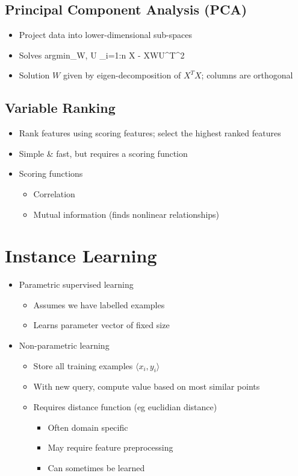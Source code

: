 \documentclass[12pt]{article}
\newcommand{\norm}[1]{\left\lVert#1\right\rVert}
\newenvironment{eqn}{\equation\alignedat{3}}{\endalignedat\endequation}
\begin{document}
\subsection{Principal Component Analysis (PCA)}

\begin{itemize}
	\item Project data into lower-dimensional sub-spaces
	\item Solves
	\begin{eqn}
		argmin_{W, U} \Sigma_{i=1:n} \norm{X - XWU^T}^2
	\end{eqn}
	\item Solution $W$ given by eigen-decomposition of $X^T X$; columns are orthogonal
\end{itemize}

\subsection{Variable Ranking}

\begin{itemize}
	\item Rank features using scoring features; select the highest ranked features
	\item Simple \& fast, but requires a scoring function
	\item Scoring functions 
	\begin{itemize}
		\item Correlation
		\item Mutual information (finds  nonlinear relationships)
	\end{itemize}
\end{itemize}

\section{Instance Learning}

\begin{itemize}
	\item Parametric supervised learning 
	\begin{itemize}
		\item Assumes we have labelled examples
		\item Learns parameter vector of fixed size
	\end{itemize}
	\item Non-parametric learning
	\begin{itemize}
		\item Store all training examples $\langle x_i, y_i \rangle$
		\item With new query, compute value based on most similar points
		\item Requires distance function (eg euclidian distance)
		\begin{itemize}
			\item Often domain specific 
			\item May require feature preprocessing 
			\item Can sometimes be learned
		\end{itemize}
	\end{itemize}
\end{itemize}
\end{document}
